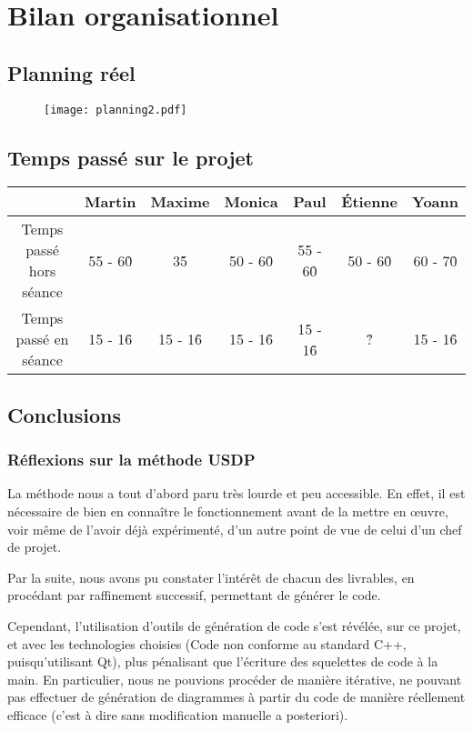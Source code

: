 \section{Bilan organisationnel}
\subsection{Planning réel}
\newpage
\begin{figure}[H]
	\texttt{[image: planning2.pdf]}
\end{figure}

\subsection{Temps passé sur le projet} 
\begin{tabular}{|c|c|c|c|c|c|c|}
\hline
& Martin & Maxime & Monica & Paul & Étienne & Yoann \\
\hline
Temps passé hors séance & 55 - 60\h & 35\h & 50 - 60\h & 55 - 60\h & 50 - 60\h & 60 - 70\h \\
Temps passé en séance & 15 - 16\h & 15 - 16\h & 15 - 16\h & 15 - 16\h & ?\h & 15 - 16\h \\
\hline
\end{tabular}

\subsection{Conclusions}
\subsubsection{Réflexions sur la méthode USDP}
La méthode nous a tout d'abord paru très lourde et peu accessible. En effet, il est nécessaire de bien en connaître le fonctionnement avant de la mettre en \oe uvre, voir même de l'avoir déjà expérimenté, d'un autre point de vue de celui d'un chef de projet.

Par la suite, nous avons pu constater l'intérêt de chacun des livrables, en procédant par raffinement successif, permettant de générer le code.

Cependant, l'utilisation d'outils de génération de code s'est révélée, sur ce projet, et avec les technologies choisies (Code non conforme au standard C++, puisqu'utilisant Qt), plus pénalisant que l'écriture des squelettes de code à la main. En particulier, nous ne pouvions procéder de manière itérative, ne pouvant pas effectuer de génération de diagrammes à partir du code de manière réellement efficace (c'est à dire sans modification manuelle a posteriori).

